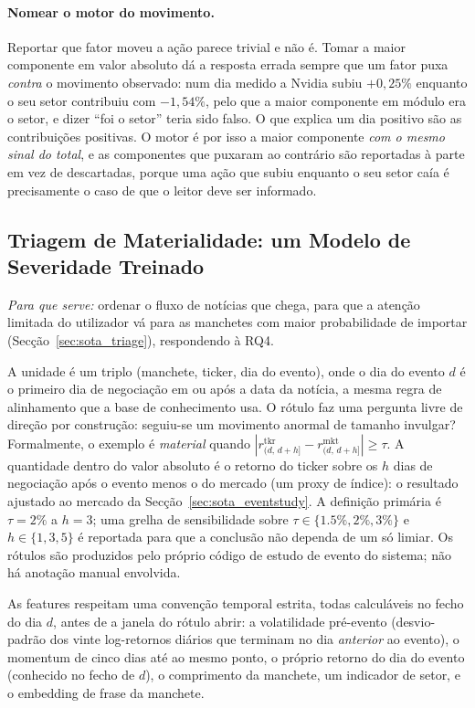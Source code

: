 \paragraph{Nomear o motor do movimento.} Reportar que fator moveu a ação parece trivial e não é. Tomar
a maior componente em valor absoluto dá a resposta errada sempre que um fator puxa \emph{contra} o
movimento observado: num dia medido a Nvidia subiu $+0,25\%$ enquanto o seu setor contribuiu com
$-1,54\%$, pelo que a maior componente em módulo era o setor, e dizer ``foi o setor'' teria sido falso.
O que explica um dia positivo são as contribuições positivas. O motor é por isso a maior componente
\emph{com o mesmo sinal do total}, e as componentes que puxaram ao contrário são reportadas à parte em
vez de descartadas, porque uma ação que subiu enquanto o seu setor caía é precisamente o caso de que o
leitor deve ser informado.

\subsection{Triagem de Materialidade: um Modelo de Severidade Treinado}
\label{sec:met_triage}

\emph{Para que serve:} ordenar o fluxo de notícias que chega, para que a atenção limitada do utilizador vá
para as manchetes com maior probabilidade de importar (Secção~\ref{sec:sota_triage}), respondendo à
\gls{RQ}4.

A unidade é um triplo (manchete, ticker, dia do evento), onde o dia do evento $d$ é o primeiro dia de
negociação em ou após a data da notícia, a mesma regra de alinhamento que a base de conhecimento usa. O
rótulo faz uma pergunta livre de direção por construção: seguiu-se um movimento anormal de tamanho invulgar?
Formalmente, o exemplo é \emph{material} quando
$|r^{\mathrm{tkr}}_{(d,\,d+h]} - r^{\mathrm{mkt}}_{(d,\,d+h]}| \ge \tau$. A quantidade dentro do valor
absoluto é o retorno do ticker sobre os $h$ dias de negociação após o evento menos o do mercado (um proxy de
índice): o resultado ajustado ao mercado da Secção~\ref{sec:sota_eventstudy}. A definição primária é
$\tau = 2\%$ a $h = 3$; uma grelha de sensibilidade sobre $\tau \in \{1.5\%, 2\%, 3\%\}$ e
$h \in \{1, 3, 5\}$ é reportada para que a conclusão não dependa de um só limiar. Os rótulos são produzidos
pelo próprio código de estudo de evento do sistema; não há anotação manual envolvida.

As features respeitam uma convenção temporal estrita, todas calculáveis no fecho do dia $d$, antes de a
janela do rótulo abrir: a volatilidade pré-evento (desvio-padrão dos vinte log-retornos diários que terminam
no dia \emph{anterior} ao evento), o momentum de cinco dias até ao mesmo ponto, o próprio retorno do dia do
evento (conhecido no fecho de $d$), o comprimento da manchete, um indicador de setor, e o embedding de frase
da manchete.

